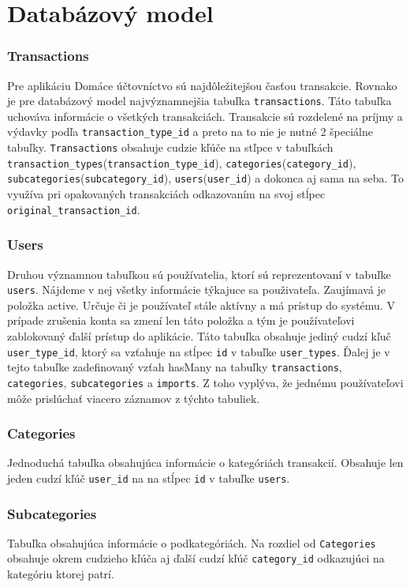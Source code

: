 \documentclass[12pt,oneside]{book}
\begin{document}
\section{Databázový model}
\subsubsection{Transactions}
Pre aplikáciu Domáce účtovníctvo sú najdôležitejšou časťou transakcie. Rovnako je pre databázový model najvýznamnejšia tabuľka \texttt{transactions}. Táto tabuľka uchováva informácie o všetkých transakciách. Transakcie sú rozdelené na príjmy a výdavky podľa \texttt{transaction\_type\_id} a preto na to nie je nutné 2 špeciálne tabuľky. \texttt{Transactions} obsahuje cudzie kľúče na stľpce v tabuľkách \texttt{transaction\_types}(\texttt{transaction\_\allowbreak type\_\allowbreak id}), \texttt{categories}(\texttt{category\_id}), \texttt{subcategories}(\texttt{subcategory\_id}), \texttt{users}(\texttt{user\_id}) a dokonca aj sama na seba. To využíva pri opakovaných transakciách odkazovaním na svoj stĺpec \texttt{original\_transaction\_id}.
\subsubsection{Users}
Druhou významnou tabuľkou sú používatelia, ktorí sú reprezentovaní v tabuľke \texttt{users}. Nájdeme v nej všetky informácie týkajuce sa použivateľa. Zaujímavá je položka active. Určuje či je používateľ stále aktívny a má prístup do systému. V prípade zrušenia konta sa zmení len táto položka a tým je používateľovi zablokovaný ďalší prístup do aplikácie. Táto tabuľka obsahuje jediný cudzí kľuč \texttt{user\_type\_id}, ktorý sa vzťahuje na stĺpec \texttt{id} v tabuľke \texttt{user\_types}. Ďalej je v tejto tabuľke zadefinovaný vzťah hasMany na tabuľky \texttt{transactions}, \texttt{categories}, \texttt{subcategories} a \texttt{imports}. Z toho vyplýva, že jednému používateľovi môže prislúchať viacero záznamov z týchto tabuliek.
\subsubsection{Categories}
Jednoduchá tabuľka obsahujúca informácie o kategóriách transakcií. Obsahuje len jeden cudzí kľúč \texttt{user\_id} na na stĺpec \texttt{id} v tabuľke \texttt{users}. 
\subsubsection{Subcategories}
Tabuľka obsahujúca informácie o podkategóriách. Na rozdiel od \texttt{Categories} obsahuje okrem cudzieho kľúča aj ďalší cudzí kľúč \texttt{category\_id} odkazujúci na kategóriu ktorej patrí.
\end{document}
